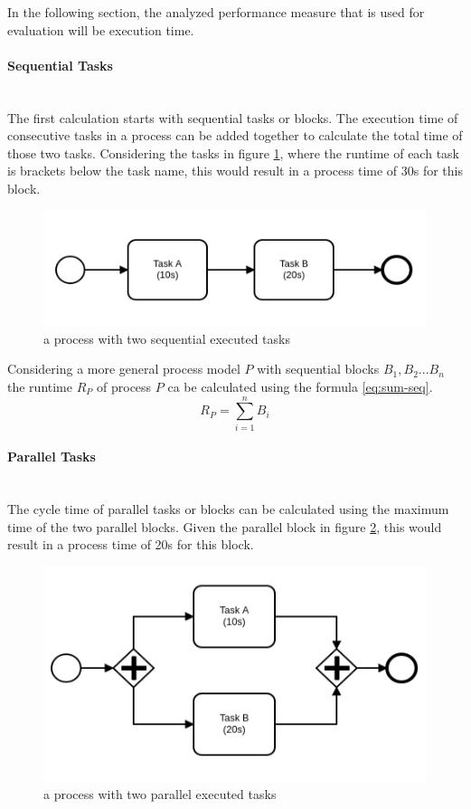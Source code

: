 In the following section, the analyzed performance measure that is used for evaluation will be execution time. 
\paragraph{Sequential Tasks}~\\
The first calculation starts with sequential tasks or blocks. The execution time of consecutive tasks in a process can be added together to calculate the total time of those two tasks. 
Considering the tasks in figure \ref{fig:sequential-tasks}, where the runtime of each task is brackets below the task name, this would result in a process time of 30s for this block. \cite{ha2006approximate} \cite{fundamentals}

\begin{figure}[H]
	\centering
	\includegraphics[width=0.5\columnwidth]{graphics/sequential-tasks}
	\caption{a process with two sequential executed tasks} 
	\label{fig:sequential-tasks} 
\end{figure}

Considering a more general process model $P$ with sequential blocks $B_1,B_2 ... B_n$ the runtime $R_P$ of process $P$ ca be calculated using the formula \ref{eq:sum-seq}. 
\begin{equation}\label{eq:sum-seq}
	R_P = \displaystyle\sum_{i=1}^{n} B_i
\end{equation}

\paragraph{Parallel Tasks}~\\
The cycle time of parallel tasks or blocks can be calculated using the maximum time of the two parallel blocks. Given the parallel block in figure \ref{fig:parallel-tasks}, this would result in a process time of 20s for this block.\cite{fundamentals}
\begin{figure}[H]
	\centering
	\includegraphics[width=0.5\columnwidth]{graphics/paralell-tasks}
	\caption{a process with two parallel executed tasks} 
	\label{fig:parallel-tasks} 
\end{figure}

